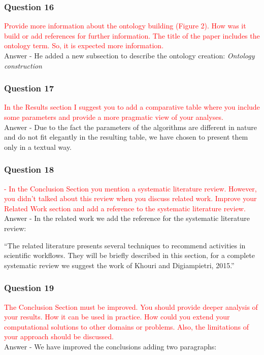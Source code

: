 \documentclass{report}
\begin{document}
\subsubsection{Question 16}
\textcolor{red}{Provide more information about the ontology building (Figure 2). How was it build or add references for further information. The title of the paper	includes the ontology term. So, it is expected more information.}
\\
Answer - He added a new subsection to describe the ontology creation: \emph{Ontology construction}


\subsubsection{Question 17}
\textcolor{red}{In the Results section I suggest you to add a comparative table where you
	include some parameters and provide a more pragmatic view of your analyses.}
\\
Answer - Due to the fact the parameters of the algorithms are different in nature and do not fit elegantly in the resulting table, we have chosen to present them only in a textual way.


\subsubsection{Question 18}
\textcolor{red}{- In the Conclusion Section you mention a systematic literature review.
	However, you didn’t talked about this review when you discuss related
	work. Improve your Related Work section and add a reference to the
	systematic literature review.
}
\\
Answer - In the related work we add the reference for the systematic literature review:

``The related literature presents several techniques to recommend activities in scientific workflows. They will be briefly described in this section, for a complete systematic review we suggest the work of Khouri and Digiampietri, 2015\nocite{Khouri2015}.''

\subsubsection{Question 19}
\textcolor{red}{The Conclusion Section must be improved. You should provide deeper
	analysis of your results. How it can be used in practice. How could you
	extend your computational solutions to other domains or problems. Also, the
	limitations of your approach should be discussed.
}
\\
Answer - We have improved the conclusions adding two paragraphs:
\end{document}
